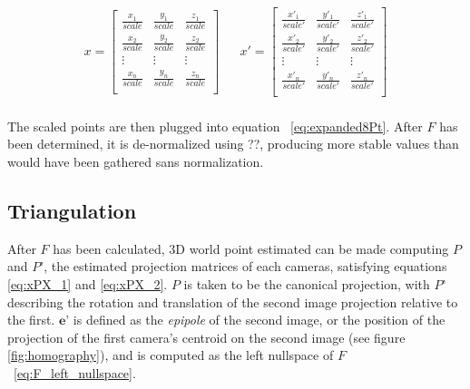 \documentclass[Conference]{IEEEtran}
\begin{document}
\begin{align}\label{eq:pointsScaled}
    x = \begin{bmatrix}
        \frac{x_1}{scale} & \frac{y_1}{scale} & \frac{z_1}{scale}\\[0.3em]
        \frac{x_2}{scale} & \frac{y_2}{scale} & \frac{z_2}{scale}\\[0.3em]
        \vdots & \vdots & \vdots\\ 
        \frac{x_n}{scale} & \frac{y_n}{scale} & \frac{z_n}{scale}\\[0.3em]
    \end{bmatrix}
&&
    x' =
    \begin{bmatrix}
        \frac{x'_1}{scale'} & \frac{y'_1}{scale'} & \frac{z'_1}{scale'}\\[0.3em] 
        \frac{x'_2}{scale'} & \frac{y'_2}{scale'} & \frac{z'_2}{scale'}\\[0.3em]
        \vdots & \vdots & \vdots\\ 
        \frac{x'_n}{scale'} & \frac{y'_n}{scale'} & \frac{z'_n}{scale'}\\[0.3em]
    \end{bmatrix}
\end{align}
\\
The scaled points are then plugged into equation ~\eqref{eq:expanded8Pt}. After $F$ has been determined, it is de-normalized using ??, producing more stable values than would have been gathered sans normalization.



\subsection{Triangulation}
After $F$ has been calculated, 3D world point estimated can be made computing $P$ and $P’$, the estimated projection matrices of each cameras, satisfying equations \eqref{eq:xPX_1} and \eqref{eq:xPX_2}. $P$ is taken to be the canonical projection, with $P’$ describing the rotation and translation of the second image projection relative to the first. $\textbf{e'}$ is defined as the \textit{epipole} of the second image, or the position of the projection of the first camera's centroid on the second image (see figure \ref{fig:homography}), and is computed as the left nullspace of $F$~\eqref{eq:F_left_nullspace}.

\begin{equation}\label{eq:xPX_1}\end{equation}
\begin{equation}\label{eq:xPX_2}\end{equation}
\begin{equation}\label{eq:P}\end{equation}
\begin{equation}\label{eq:P_prime}\end{equation}
\begin{equation}\label{eq:F_left_nullspace}\end{equation}
\end{document}
